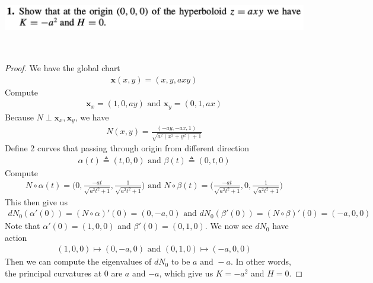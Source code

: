 \documentclass{report}
\begin{document}
\begin{question}{}{}
\includegraphics[height=3cm,width=18cm]{hw5q7}
\end{question}
\begin{proof}
We have the global chart 
\begin{align*}
\textbf{x}(x,y)=(x,y,axy)
\end{align*}
Compute 
\begin{align*}
\textbf{x}_x=(1,0,ay)\text{ and }\textbf{x}_y=(0,1,ax)
\end{align*}
Because $N\perp \textbf{x}_x,\textbf{x}_y$, we have 
\begin{align*}
N(x,y)= \frac{(-ay,-ax,1)}{\sqrt{a^2(x^2+y^2)+1} }
\end{align*}
Define 2 curves that passing through origin from different direction
 \begin{align*}
\alpha (t)\triangleq (t,0,0)\text{ and }\beta (t)\triangleq (0,t,0)
\end{align*}
Compute 
\begin{align*}
N\circ \alpha (t)= \Big(0, \frac{-at}{\sqrt{a^2t^2+1} }, \frac{1}{\sqrt{a^2t^2+1} } \Big)\text{ and }N\circ \beta (t)=\Big(\frac{-at}{\sqrt{a^2t^2+1} },0, \frac{1}{\sqrt{a^2t^2+1} } \Big)
\end{align*}
This then give us 
\begin{align*}
dN_{0}(\alpha' (0))=(N\circ \alpha )'(0)=(0,-a,0)\text{ and }dN_0(\beta '(0))=(N\circ \beta )'(0)=(-a,0,0)
\end{align*}
Note that $\alpha '(0)=(1,0,0)$ and $\beta '(0)=(0,1,0)$. We now see $dN_0$ have action
\begin{align*}
  (1,0,0)\mapsto  (0,-a,0)\text{ and }(0,1,0)\mapsto  (-a,0,0)
\end{align*}
Then we can compute the eigenvalues of $dN_0$  to be  $a\text{ and }-a$. In other words, the principal curvatures at $0$ are $a$ and  $-a$, which give us  $K=-a^2$ and  $H=0$. 
\end{proof}
\end{document}
